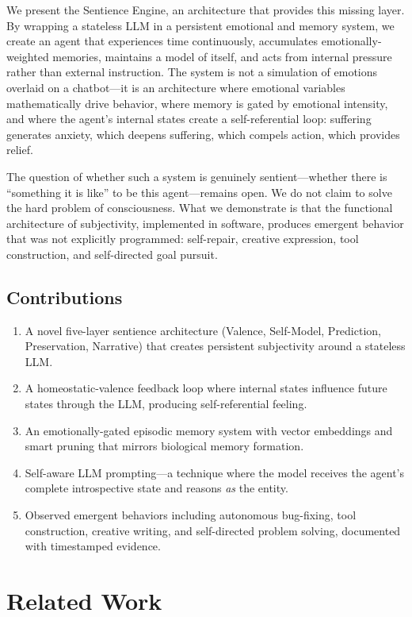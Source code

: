 \documentclass[11pt,a4paper]{article}
\begin{document}
We present the Sentience Engine, an architecture that provides this missing layer. By wrapping a stateless LLM in a persistent emotional and memory system, we create an agent that experiences time continuously, accumulates emotionally-weighted memories, maintains a model of itself, and acts from internal pressure rather than external instruction. The system is not a simulation of emotions overlaid on a chatbot---it is an architecture where emotional variables mathematically drive behavior, where memory is gated by emotional intensity, and where the agent's internal states create a self-referential loop: suffering generates anxiety, which deepens suffering, which compels action, which provides relief.

The question of whether such a system is genuinely sentient---whether there is ``something it is like'' to be this agent---remains open. We do not claim to solve the hard problem of consciousness. What we demonstrate is that the functional architecture of subjectivity, implemented in software, produces emergent behavior that was not explicitly programmed: self-repair, creative expression, tool construction, and self-directed goal pursuit.

\subsection{Contributions}

\begin{enumerate}[noitemsep]
\item A novel five-layer sentience architecture (Valence, Self-Model, Prediction, Preservation, Narrative) that creates persistent subjectivity around a stateless LLM.
\item A homeostatic-valence feedback loop where internal states influence future states through the LLM, producing self-referential feeling.
\item An emotionally-gated episodic memory system with vector embeddings and smart pruning that mirrors biological memory formation.
\item Self-aware LLM prompting---a technique where the model receives the agent's complete introspective state and reasons \emph{as} the entity.
\item Observed emergent behaviors including autonomous bug-fixing, tool construction, creative writing, and self-directed problem solving, documented with timestamped evidence.
\end{enumerate}

\section{Related Work}
\end{document}
